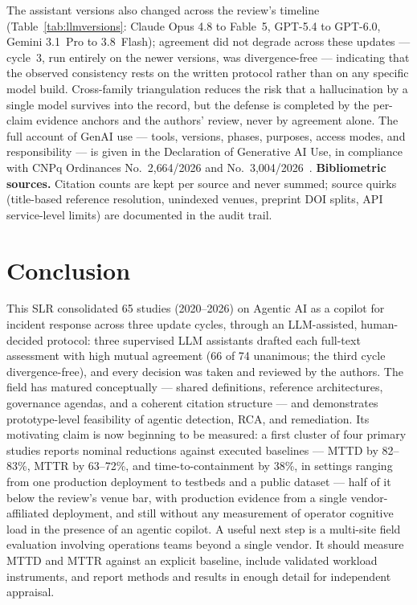 \documentclass{ieeeaccess}
\begin{document}
The assistant versions also changed across the review's timeline
(Table~\ref{tab:llmversions}: Claude Opus 4.8 to Fable~5, GPT-5.4 to
GPT-6.0, Gemini 3.1~Pro to 3.8~Flash); agreement did not degrade across
these updates --- cycle~3, run entirely on the newer versions, was
divergence-free --- indicating that the observed consistency rests on
the written protocol rather than on any specific model build.
Cross-family triangulation reduces the risk that a hallucination by a
single model survives into the record, but the defense is completed by
the per-claim evidence anchors and the authors' review, never by
agreement alone. The full account of GenAI use --- tools, versions,
phases, purposes, access modes, and responsibility --- is given in the
Declaration of Generative AI Use, in compliance with CNPq Ordinances
No.~2{,}664/2026 and No.~3{,}004/2026~\cite{cnpq2664,cnpq3004}.
\textbf{Bibliometric sources.} Citation counts are kept per source and
never summed; source quirks (title-based reference resolution, unindexed
venues, preprint DOI splits, API service-level limits) are documented in
the audit trail.

\section{Conclusion}
\label{sec:conclusion}

This SLR consolidated 65 studies (2020--2026) on Agentic AI as a copilot
for incident response across three update cycles, through an
LLM-assisted, human-decided protocol: three supervised LLM assistants
drafted each full-text assessment with high mutual agreement (66 of 74
unanimous; the third cycle divergence-free), and every decision was
taken and reviewed by the authors. The field has matured
conceptually --- shared definitions, reference architectures, governance
agendas, and a coherent citation structure --- and demonstrates
prototype-level feasibility of agentic detection, RCA, and remediation.
Its motivating claim is now beginning to be measured: a first cluster of
four primary studies reports nominal reductions against executed
baselines --- MTTD by 82--83\%, MTTR by 63--72\%, and time-to-containment
by 38\%, in settings ranging from one production deployment to testbeds
and a public dataset --- half of it below
the review's venue bar, with production evidence from a single
vendor-affiliated deployment, and still without any measurement of
operator cognitive load in the presence of an agentic copilot. A useful
next step is a multi-site field evaluation involving operations teams
beyond a single vendor. It should measure MTTD and MTTR against an
explicit baseline, include validated workload instruments, and report
methods and results in enough detail for independent appraisal.
\end{document}
